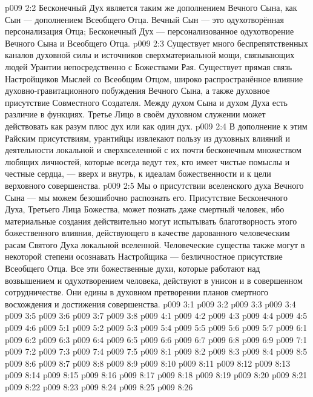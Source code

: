 \vs p009 2:2 Бесконечный Дух является таким же дополнением Вечного Сына, как Сын --- дополнением Всеобщего Отца. Вечный Сын --- это одухотворённая персонализация Отца; Бесконечный Дух --- персонализованное одухотворение Вечного Сына и Всеобщего Отца.
\vs p009 2:3 Существует много беспрепятственных каналов духовной силы и источников сверхматериальной мощи, связывающих людей Урантии непосредственно с Божествами Рая. Существует прямая связь Настройщиков Мыслей со Всеобщим Отцом, широко распространённое влияние духовно\hyp{}гравитационного побуждения Вечного Сына, а также духовное присутствие Совместного Создателя. Между духом Сына и духом Духа есть различие в функциях. Третье Лицо в своём духовном служении может действовать как разум плюс дух или как один дух.
\vs p009 2:4 В дополнение к этим Райским присутствиям, урантийцы извлекают пользу из духовных влияний и деятельности локальной и сверхвселенной с их почти бесконечным множеством любящих личностей, которые всегда ведут тех, кто имеет чистые помыслы и честные сердца, --- вверх и внутрь, к идеалам божественности и к цели верховного совершенства.
\vs p009 2:5 Мы  о присутствии вселенского духа Вечного Сына --- мы можем безошибочно распознать его. Присутствие Бесконечного Духа, Третьего Лица Божества, может познать даже смертный человек, ибо материальные создания действительно могут испытывать благотворность этого божественного влияния, действующего в качестве дарованного человеческим расам Святого Духа локальной вселенной. Человеческие существа также могут в некоторой степени осознавать Настройщика --- безличностное присутствие Всеобщего Отца. Все эти божественные духи, которые работают над возвышением и одухотворением человека, действуют в унисон и в совершенном сотрудничестве. Они едины в духовном претворении планов смертного восхождения и достижения совершенства.
\vs p009 3:1 
\vs p009 3:2 \pc 
\vs p009 3:3 \pc 
\vs p009 3:4 
\vs p009 3:5 \pc 
\vs p009 3:6 
\vs p009 3:7 
\vs p009 3:8 
\vs p009 4:1 
\vs p009 4:2 
\vs p009 4:3 \pc 
\vs p009 4:4 
\vs p009 4:5 \pc 
\vs p009 4:6 
\vs p009 5:1 
\vs p009 5:2 
\vs p009 5:3 
\vs p009 5:4 \pc 
\vs p009 5:5 \pc 
\vs p009 5:6 
\vs p009 5:7 
\vs p009 6:1 
\vs p009 6:2 
\vs p009 6:3 \pc 
\vs p009 6:4 \pc 
\vs p009 6:5 
\vs p009 6:6 \pc 
\vs p009 6:7 
\vs p009 6:8 \pc 
\vs p009 6:9 \pc 
{}
\vs p009 7:1 
\vs p009 7:2 
\vs p009 7:3 
\vs p009 7:4 \pc 
\vs p009 7:5 
\vs p009 8:1 
\vs p009 8:2 
\vs p009 8:3 
\vs p009 8:4 
\vs p009 8:5 
\vs p009 8:6 \pc 
\vs p009 8:7 
\vs p009 8:8 
\vs p009 8:9 \pc 
\vs p009 8:10 \pc 
\vs p009 8:11 \pc 
\vs p009 8:12 
\vs p009 8:13 
\vs p009 8:14 \pc 
\vs p009 8:15 
\vs p009 8:16 
\vs p009 8:17 
\vs p009 8:18 
\vs p009 8:19 
\vs p009 8:20 
\vs p009 8:21 
\vs p009 8:22 
\vs p009 8:23 
\vs p009 8:24 
\vs p009 8:25 
\vsetoff
\vs p009 8:26 
\quizlink
